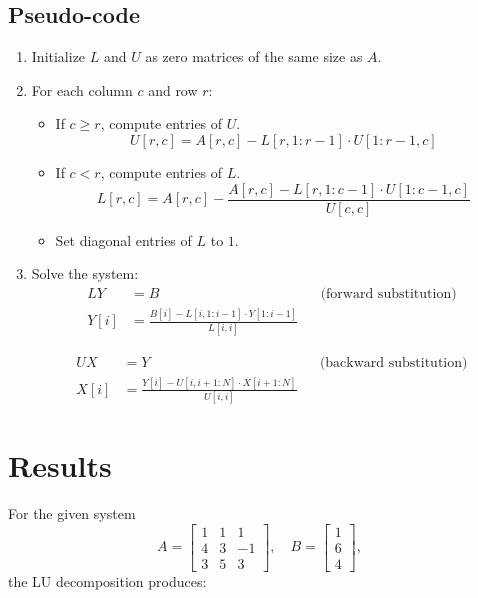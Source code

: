 \subsection*{Pseudo-code}
\begin{enumerate}
  \item Initialize $L$ and $U$ as zero matrices of the same size as $A$.
  \item For each column $c$ and row $r$:
    \begin{itemize}
      \item If $c \geq r$, compute entries of $U$.
        \begin{equation}
            U[r,c] = A[r,c] - L[r,1:r-1] \cdot U[1:r-1,c]
        \label{eq:computeu}
        \end{equation}
      \item If $c < r$, compute entries of $L$.
            \begin{equation}
            L[r,c] = A[r,c] - \frac{A[r,c] - L[r,1:c-1] \cdot U[1:c-1,c]}{U[c,c]}
          \label{eq:computel}
          \end{equation}
      \item Set diagonal entries of $L$ to $1$.
    \end{itemize}
  \item Solve the system:
        \begin{equation}
          \begin{aligned}
            LY &= B && \text{(forward substitution)} \\
            Y[i] &= \frac{B[i] - L[i,1:i-1] \cdot Y[1:i-1]}{L[i,i]}
          \end{aligned}
          \label{eq:forsubs}
        \end{equation}

        \begin{equation}
          \begin{aligned}
            UX &= Y && \text{(backward substitution)} \\
            X[i] &= \frac{Y[i] - U[i,i+1:N] \cdot X[i+1:N]}{U[i,i]}
          \end{aligned}
          \label{eq:backsubs}
        \end{equation}
\end{enumerate}

\section*{Results}
For the given system
\[
A = \begin{bmatrix}
1 & 1 & 1 \\
4 & 3 & -1 \\
3 & 5 & 3
\end{bmatrix}, \quad
B = \begin{bmatrix}
1 \\ 6 \\ 4
\end{bmatrix},
\]
the LU decomposition produces:

